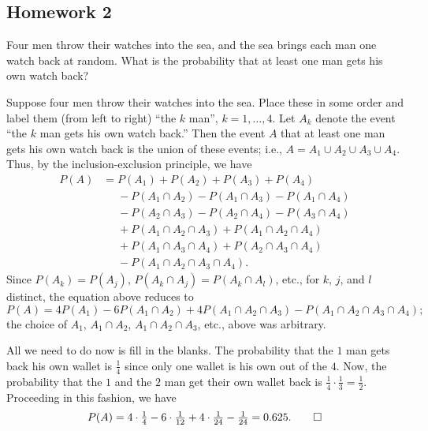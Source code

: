\subsection{Homework 2}
\begin{problem}[Handout 2, \# 5]
  Four men throw their watches into the sea, and the sea brings each man
  one watch back at random. What is the probability that at least one man
  gets his own watch back?
\end{problem}
\begin{solution*}
  Suppose four men throw their watches into the sea. Place these in some
  order and label them (from left to right) ``the \(k\) man'',
  \(k=1,\dotsc,4\). Let \(A_k\) denote the event ``the \(k\)
  man gets his own watch back.'' Then the event \(A\) that at least one man
  gets his own watch back is the union of these events; i.e.,
  \(A=A_1\cup A_2\cup A_3\cup A_4\). Thus, by the inclusion-exclusion
  principle, we have
  \begin{align*}
    P(A)
    &=P(A_1)+P(A_2)+P(A_3)+P(A_4)\\
    &\phantom{{}={}}-P(A_1\cap A_2)-P(A_1\cap A_3)-P(A_1\cap A_4)\\
    &\phantom{{}={}}-P(A_2\cap A_3)-P(A_2\cap A_4)-P(A_3\cap A_4)\\
    &\phantom{{}={}}+P(A_1\cap A_2\cap A_3)+P(A_1\cap A_2\cap A_4)\\
    &\phantom{{}={}}+P(A_1\cap A_3\cap A_4)+P(A_2\cap A_3\cap A_4)\\
    &\phantom{{}={}}-P(A_1\cap A_2\cap A_3\cap A_4).
  \end{align*}
  Since \(P(A_k)=P(A_j)\), \(P(A_k\cap A_j)=P(A_k\cap A_l)\), etc., for
  \(k\), \(j\), and \(l\) distinct, the equation above reduces to
  \[
    P(A)=4P(A_1)-6P(A_1\cap A_2)+4P(A_1\cap A_2\cap A_3)-P(A_1\cap A_2\cap
    A_3\cap A_4);
  \]
  the choice of \(A_1\), \(A_1\cap A_2\), \(A_1\cap A_2\cap A_3\), etc.\@,
  above was arbitrary.

  All we need to do now is fill in the blanks. The probability that the
  \(1\) man gets back his own wallet is \(\frac{1}{4}\) since
  only one wallet is his own out of the \(4\). Now, the probability that
  the \(1\) and the \(2\) man get their own wallet
  back is \(\frac{1}{4}\cdot\frac{1}{3}=\frac{1}{2}\). Proceeding in this
  fashion, we have
  \[
    P(A)=4\cdot\tfrac{1}{4}-6\cdot\tfrac{1}{12}+4\cdot\tfrac{1}{24}-\tfrac{1}{24}
    =0.625.\qedhere
  \]
\end{solution*}

